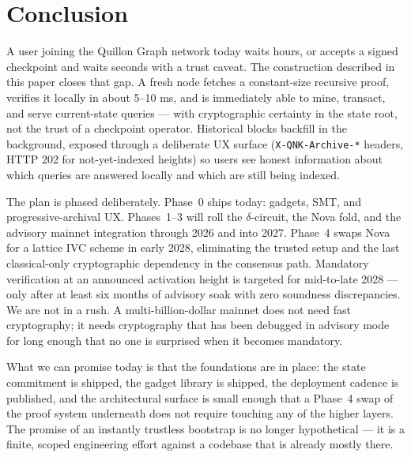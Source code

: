 \documentclass[11pt,a4paper]{article}
\begin{document}
\section{Conclusion}
\label{sec:conclusion}

A user joining the Quillon Graph network today waits hours, or accepts a
signed checkpoint and waits seconds with a trust caveat. The construction
described in this paper closes that gap. A fresh node fetches a
constant-size recursive proof, verifies it locally in about 5--10 ms,
and is immediately able to mine, transact, and serve current-state
queries --- with cryptographic certainty in the state root, not the
trust of a checkpoint operator. Historical blocks backfill in the
background, exposed through a deliberate UX surface
(\texttt{X-QNK-Archive-*} headers, HTTP 202 for not-yet-indexed
heights) so users see honest information about which queries are
answered locally and which are still being indexed.

The plan is phased deliberately. Phase~0 ships today: gadgets, SMT,
and progressive-archival UX. Phases~1--3 will roll the $\delta$-circuit,
the Nova fold, and the advisory mainnet integration through 2026 and
into 2027. Phase~4 swaps Nova for a lattice IVC scheme in early 2028,
eliminating the trusted setup and the last classical-only cryptographic
dependency in the consensus path. Mandatory verification at an
announced activation height is targeted for mid-to-late 2028 --- only
after at least six months of advisory soak with zero soundness
discrepancies. We are not in a rush. A multi-billion-dollar mainnet
does not need fast cryptography; it needs cryptography that has been
debugged in advisory mode for long enough that no one is surprised
when it becomes mandatory.

What we can promise today is that the foundations are in place: the
state commitment is shipped, the gadget library is shipped, the
deployment cadence is published, and the architectural surface is
small enough that a Phase~4 swap of the proof system underneath does
not require touching any of the higher layers. The promise of an
instantly trustless bootstrap is no longer hypothetical --- it is a
finite, scoped engineering effort against a codebase that is already
mostly there.
\end{document}
